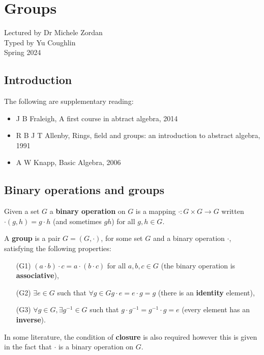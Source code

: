 \documentclass[../Year1.tex]{subfiles}
\begin{document}
\chapter{Groups}
\renewcommand*\thesection{\arabic{section}}
Lectured by Dr Michele Zordan \\ Typed by Yu Coughlin \\
Spring 2024

\section*{Introduction}


The following are supplementary reading:
\begin{itemize}
    \item J B Fraleigh, A first course in abtract algebra, 2014
    \item R B J T Allenby, Rings, field and groups: an introduction to abstract algebra, 1991
    \item A W Knapp, Basic Algebra, 2006
\end{itemize}

\tableofcontents\pagebreak

\section{Binary operations and groups}

\begin{definition}
    Given a set $G$ a \textbf{binary operation} on $G$ is a mapping $\cdot: G\times G \rightarrow G$ written $\cdot(g,h) = g\cdot h$ (and sometimes $gh$) for all $g,h\in G$.
\end{definition}

\begin{definition}[Group]
    A \textbf{group} is a pair $G=(G,\cdot)$, for some set $G$ and a binary operation $\cdot$, satisfying the following properties: \begin{enumerate}
        \item[(G1)] $(a\cdot b)\cdot c = a \cdot (b\cdot c)$ for all $a,b,c\in G$ (the binary operation is \textbf{associative}),
        \item[(G2)] $\exists e\in G$ such that $\forall g\in G g\cdot e = e\cdot g = g $ (there is an \textbf{identity} element),
        \item[(G3)] $\forall g\in G, \exists g^{-1} \in G$ such that $g\cdot g^{-1} = g^{-1}\cdot g = e$ (every element has an \textbf{inverse}).
    \end{enumerate}
    In some literature, the condition of \textbf{closure} is also required however this is given in the fact that $\cdot$ is a binary operation on $G$.
\end{definition}
\end{document}
